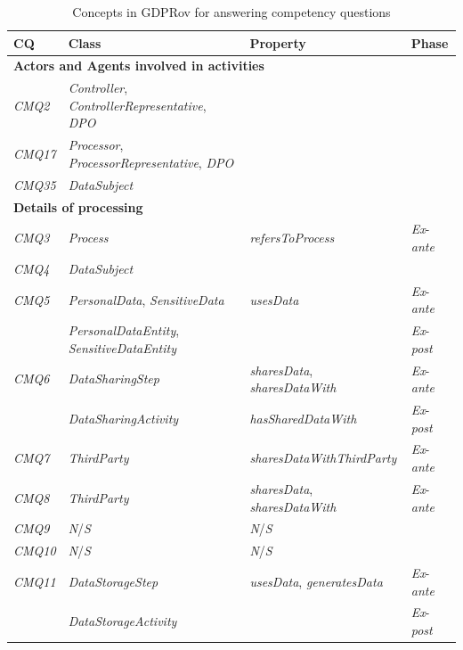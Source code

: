 \begin{table}
\centering
\caption{Concepts in GDPRov for answering competency questions}
\begin{tabularx}{\textwidth}{|l|X|p{5cm}|l|}
\hline
\textbf{CQ} & \textbf{Class} & \textbf{Property} & \textbf{Phase} \\ \hline
\multicolumn{4}{|l|}{\textbf{Actors and Agents involved in activities}}  \\ \hline
\textit{CMQ2} & \textit{Controller}, \textit{ControllerRepresentative}, \textit{DPO} &  &  \\ \hline
\textit{CMQ17} & \textit{Processor}, \textit{ProcessorRepresentative}, \textit{DPO} &  &  \\ \hline
\textit{CMQ35} & \textit{DataSubject} &  &  \\ \hline
\multicolumn{4}{|l|}{\textbf{Details of processing}}  \\ \hline
\textit{CMQ3} & \textit{Process} & \textit{refersToProcess} & \textit{Ex}-\textit{ante} \\ \hline
\textit{CMQ4} & \textit{DataSubject} &  &  \\ \hline
\textit{CMQ5} & \textit{PersonalData}, \textit{SensitiveData} & \textit{usesData} & \textit{Ex}-\textit{ante} \\ \hline
 & \textit{PersonalDataEntity}, \textit{SensitiveDataEntity} &  & \textit{Ex}-\textit{post} \\ \hline
\textit{CMQ6} & \textit{DataSharingStep} & \textit{sharesData}, \textit{sharesDataWith} & \textit{Ex}-\textit{ante} \\ \hline
 & \textit{DataSharingActivity} & \textit{hasSharedDataWith} & \textit{Ex}-\textit{post} \\ \hline
\textit{CMQ7} & \textit{ThirdParty} & \textit{sharesDataWithThirdParty} & \textit{Ex}-\textit{ante} \\ \hline
\textit{CMQ8} & \textit{ThirdParty} & \textit{sharesData}, \textit{sharesDataWith} & \textit{Ex}-\textit{ante} \\ \hline
\textit{CMQ9} & \textit{N}/\textit{S} & \textit{N}/\textit{S} &  \\ \hline
\textit{CMQ10} & \textit{N}/\textit{S} & \textit{N}/\textit{S} &  \\ \hline
\textit{CMQ11} & \textit{DataStorageStep} & \textit{usesData}, \textit{generatesData} & \textit{Ex}-\textit{ante} \\ \hline
 & \textit{DataStorageActivity} &  & \textit{Ex}-\textit{post} \\ \hline

\end{tabularx}
\end{table}
